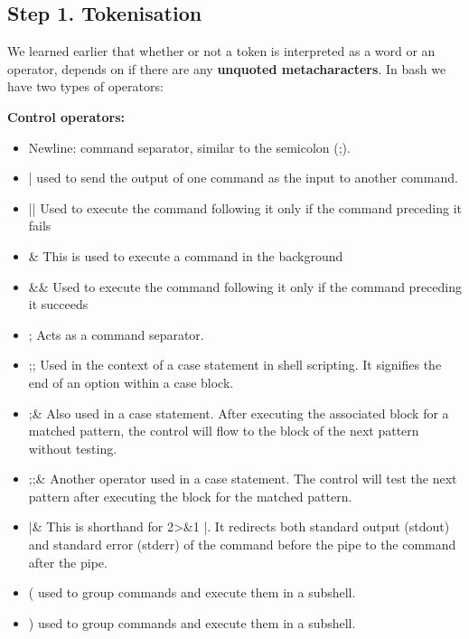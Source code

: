 \documentclass{report}
\begin{document}
    \subsection{Step 1. Tokenisation}
    \bigbreak \noindent 
    We learned earlier that whether or not a token is interpreted as a word or an operator, depends on if there are any \textbf{unquoted metacharacters}. In bash we have two types of operators:
    \bigbreak \noindent 
    \begin{minipage}[t]{0.5\textwidth}
    \textbf{Control operators:}
    \begin{itemize}
        \item Newline: command separator, similar to the semicolon (;).
        \item | used to send the output of one command as the input to another command.
        \item || Used to execute the command following it only if the command preceding it fails 
        \item \& This is used to execute a command in the background
        \item \&\& Used to execute the command following it only if the command preceding it succeeds 
        \item ; Acts as a command separator.
        \item ;; Used in the context of a case statement in shell scripting. It signifies the end of an option within a case block.
        \item ;\& Also used in a case statement. After executing the associated block for a matched pattern, the control will flow to the block of the next pattern without testing.
        \item ;;\& Another operator used in a case statement. The control will test the next pattern after executing the block for the matched pattern.
        \item |\& This is shorthand for 2>\&1 |. It redirects both standard output (stdout) and standard error (stderr) of the command before the pipe to the command after the pipe.
        \item ( used to group commands and execute them in a subshell. 
        \item ) used to group commands and execute them in a subshell. 
    \end{itemize}
   \end{minipage}
\end{document}
